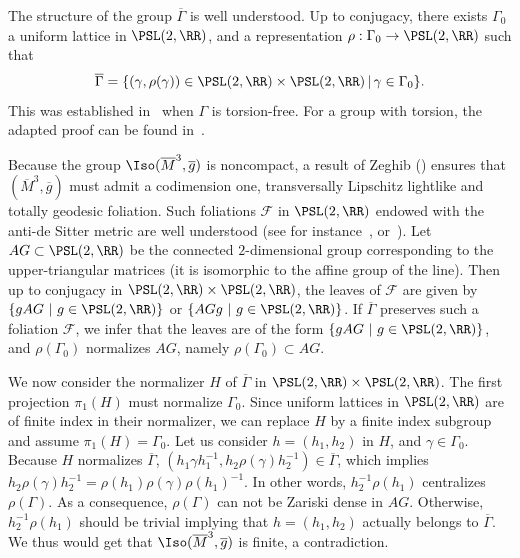 The structure of the group $\overline{\Gamma}$ is well understood. Up to conjugacy, there exists $\Gamma_0$ a uniform lattice in $\PSL(2,\RR)$, and a representation $\rho: \Gamma_0 \to \PSL(2,\RR)$ such that
\[
\overline{\Gamma}=\{ (\gamma,\rho(\gamma)) \in \PSL(2,\RR) \times \PSL(2,\RR) \, | \, \gamma \in \Gamma_0 \}.
\]
This was established in~\cite[Theorem~5.2]{kulkarni.raymond} when $\Gamma$ is torsion-free. For a group with torsion, the adapted proof can be found in~\cite[Lemma~4.3.1]{tholozan}.

Because the group $\Iso(\overline{M}^3,\overline{g})$ is noncompact, a result of Zeghib (\cite[Theorem~1.2]{zeghibisom1}) ensures that $(\overline{M}^3,\overline{g})$ must admit a codimension one, transversally Lipschitz lightlike and totally geodesic foliation. Such foliations ${\mathcal F}$ in $\PSL(2,\RR)$ endowed with the anti-de Sitter metric are well understood (see for instance~\cite[Lemme~3.3.2.9]{saleinthese}, or~\cite[Section~15.2]{zeghibisom1}). Let $AG \subset \PSL(2,\RR)$ be the connected $2$-dimensional group corresponding to the upper-triangular matrices (it is isomorphic to the affine group of the line). Then up to conjugacy in $\PSL(2,\RR) \times \PSL(2,\RR)$, the leaves of ${\mathcal F}$ are given by $\{ gAG \ | \ g \in \PSL(2,\RR)\}$ or $\{ AGg \ | \ g \in \PSL(2,\RR)\}$. If $\overline{\Gamma}$ preserves such a foliation ${\mathcal F}$, we infer that the leaves are of the form $\{ gAG \ | \ g \in \PSL(2,\RR)\}$, and $\rho(\Gamma_0)$ normalizes $AG$, namely $\rho(\Gamma_0) \subset AG$.

We now consider the normalizer $H$ of $\overline{\Gamma}$ in $\PSL(2,\RR) \times \PSL(2,\RR)$. The first projection $\pi_1(H)$ must normalize $\Gamma_0$. Since uniform lattices in $\PSL(2,\RR)$ are of finite index in their normalizer, we can replace $H$ by a finite index subgroup and assume $\pi_1(H)=\Gamma_0$. Let us consider $h=(h_1,h_2)$ in $H$, and $\gamma \in \Gamma_0$. Because $H$ normalizes $\overline{\Gamma}$, $(h_1 \gamma h_1^{-1}, h_2 \rho(\gamma)h_2^{-1}) \in \overline{\Gamma}$, which implies $h_2 \rho(\gamma)h_2^{-1}=\rho(h_1)\rho(\gamma) \rho(h_1)^{-1}$. In other words, $h_2^{-1}\rho(h_1)$ centralizes $\rho(\Gamma)$. As a consequence, $\rho(\Gamma)$ can not be Zariski dense in $AG$. Otherwise, $h_2^{-1}\rho(h_1)$ should be trivial implying that $h=(h_1,h_2)$ actually belongs to $\overline{\Gamma}$. We thus would get that $\Iso(\overline{M}^3,\overline{g})$ is finite, a contradiction.

